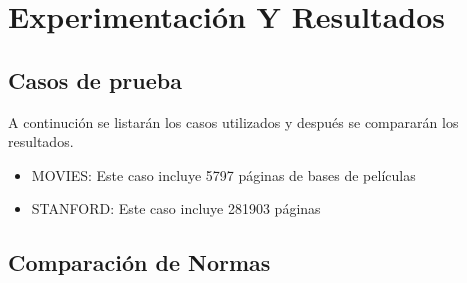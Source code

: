 \section{Experimentación Y Resultados}

\subsection{Casos de prueba}
   A continución se listarán los casos utilizados y después se compararán los resultados.

	\begin{itemize}
		\item MOVIES: Este caso incluye 5797 páginas de bases de películas
		\item STANFORD: Este caso incluye 281903 páginas

	\end{itemize}   

\subsection{Comparación de Normas}
 